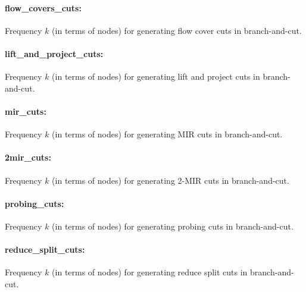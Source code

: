 \paragraph{flow\_covers\_cuts:}\label{sec:couenne_flow_covers_cuts} Frequency $k$ (in terms of nodes) for generating flow cover cuts in branch-and-cut. $\;$ 

\paragraph{lift\_and\_project\_cuts:}\label{sec:couenne_lift_and_project_cuts} Frequency $k$ (in terms of nodes) for generating lift and project cuts in branch-and-cut. $\;$ 

\paragraph{mir\_cuts:}\label{sec:couenne_mir_cuts} Frequency $k$ (in terms of nodes) for generating MIR cuts in branch-and-cut. $\;$ 

\paragraph{2mir\_cuts:}\label{sec:couenne_2mir_cuts} Frequency $k$ (in terms of nodes) for generating 2-MIR cuts in branch-and-cut. $\;$

\paragraph{probing\_cuts:}\label{sec:couenne_probing_cuts} Frequency $k$ (in terms of nodes) for generating probing cuts in branch-and-cut. $\;$ 

\paragraph{reduce\_split\_cuts:}\label{sec:couenne_reduce_split_cuts} Frequency $k$ (in terms of nodes) for generating reduce split cuts in branch-and-cut. $\;$ 

